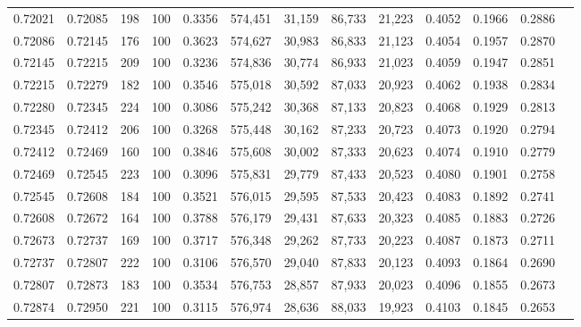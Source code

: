 \begin{tabular}{rrrrrrrrrrrrr}
0.72021 & 0.72085 &   198 & 100 &                                     0.3356 & 574,451 &  31,159 &  86,733 &  21,223 & 0.4052 & 0.1966 & 0.2886 \\
0.72086 & 0.72145 &   176 & 100 &                                     0.3623 & 574,627 &  30,983 &  86,833 &  21,123 & 0.4054 & 0.1957 & 0.2870 \\
0.72145 & 0.72215 &   209 & 100 &                                     0.3236 & 574,836 &  30,774 &  86,933 &  21,023 & 0.4059 & 0.1947 & 0.2851 \\
0.72215 & 0.72279 &   182 & 100 &                                     0.3546 & 575,018 &  30,592 &  87,033 &  20,923 & 0.4062 & 0.1938 & 0.2834 \\
0.72280 & 0.72345 &   224 & 100 &                                     0.3086 & 575,242 &  30,368 &  87,133 &  20,823 & 0.4068 & 0.1929 & 0.2813 \\
0.72345 & 0.72412 &   206 & 100 &                                     0.3268 & 575,448 &  30,162 &  87,233 &  20,723 & 0.4073 & 0.1920 & 0.2794 \\
0.72412 & 0.72469 &   160 & 100 &                                     0.3846 & 575,608 &  30,002 &  87,333 &  20,623 & 0.4074 & 0.1910 & 0.2779 \\
0.72469 & 0.72545 &   223 & 100 &                                     0.3096 & 575,831 &  29,779 &  87,433 &  20,523 & 0.4080 & 0.1901 & 0.2758 \\
0.72545 & 0.72608 &   184 & 100 &                                     0.3521 & 576,015 &  29,595 &  87,533 &  20,423 & 0.4083 & 0.1892 & 0.2741 \\
0.72608 & 0.72672 &   164 & 100 &                                     0.3788 & 576,179 &  29,431 &  87,633 &  20,323 & 0.4085 & 0.1883 & 0.2726 \\
0.72673 & 0.72737 &   169 & 100 &                                     0.3717 & 576,348 &  29,262 &  87,733 &  20,223 & 0.4087 & 0.1873 & 0.2711 \\
0.72737 & 0.72807 &   222 & 100 &                                     0.3106 & 576,570 &  29,040 &  87,833 &  20,123 & 0.4093 & 0.1864 & 0.2690 \\
0.72807 & 0.72873 &   183 & 100 &                                     0.3534 & 576,753 &  28,857 &  87,933 &  20,023 & 0.4096 & 0.1855 & 0.2673 \\
0.72874 & 0.72950 &   221 & 100 &                                     0.3115 & 576,974 &  28,636 &  88,033 &  19,923 & 0.4103 & 0.1845 & 0.2653 \\

\end{tabular}
